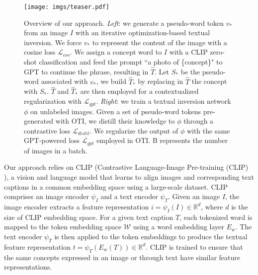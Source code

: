\documentclass[10pt,twocolumn,letterpaper]{article}
\begin{document}
\begin{figure*}[!htb]
    \centering
    \texttt{[image: imgs/teaser.pdf]}
    \vspace{-3.5ex}
    \caption{Overview of our approach. \textit{Left}: we generate a pseudo-word token $v_*$ from an image $I$ with an iterative optimization-based textual inversion. We force $v_*$ to represent the content of the image with a cosine loss $\mathcal{L}_{cos}$.
    We assign a concept word to $I$ with a CLIP zero-shot classification and feed the prompt ``a photo of \{concept\}" to GPT to continue the phrase, resulting in $\widehat{T}$. Let $S_*$ be the pseudo-word associated with $v_*$, we build $\widehat{T}_*$ by replacing in $\widehat{T}$ the concept with $S_*$. $\widehat{T}$ and $\widehat{T}_*$ are then employed for a contextualized regularization with $\mathcal{L}_{gpt}$. \textit{Right}: we train a textual inversion network $\phi$ on unlabeled images. Given a set of pseudo-word tokens pre-generated with OTI, we distill their knowledge to $\phi$ through a contrastive loss $\mathcal{L}_{distil}$. We regularize the output of $\phi$ with the same GPT-powered loss $\mathcal{L}_{gpt}$ employed in OTI. B represents the number of images in a batch.
    }
    \vspace{-4pt}
    \label{fig:teaser}
\end{figure*}

Our approach relies on CLIP (Contrastive Language-Image Pre-training (CLIP) \cite{radford2021learning}), a vision and language model that learns to align images and corresponding text captions in a common embedding space using a large-scale dataset. CLIP comprises an image encoder $\psi_{I}$ and a text encoder $\psi_{T}$. Given an image $I$, the image encoder extracts a feature representation $i = \psi_{I}(I) \in \mathbb{R}^{d}$, where $d$ is the size of CLIP embedding space. For a given text caption $T$, each tokenized word is mapped to the token embedding space $\mathcal{W}$ using a word embedding layer $E_w$. The text encoder $\psi_{T}$ is then applied to the token embeddings to produce the textual feature representation $t=\psi_{T}(E_w(T)) \in \mathbb{R}^{d}$. CLIP is trained to ensure that the same concepts expressed in an image or through text have similar feature representations.
 
\end{document}
